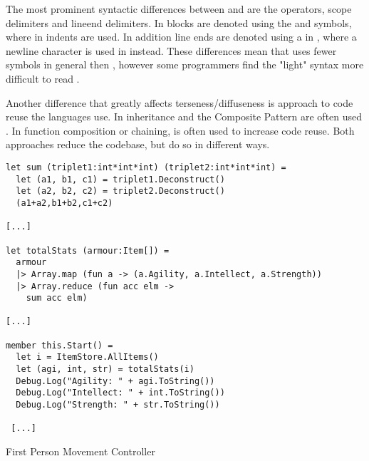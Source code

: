 The most prominent syntactic differences between \cs and \fs are the operators, scope delimiters and lineend delimiters. In \cs blocks are denoted using the \m{\{} and \m{\}} symbols, where in \fs indents are used. In addition line ends are denoted using a \m{;} in \cs, where a newline character is used in \fs instead. These differences mean that \fs uses fewer symbols in general then \cs, however some programmers find the "light" syntax more difficult to read \needcite.

Another difference that greatly affects terseness/diffuseness is approach to code reuse the languages use. In \cs inheritance and the Composite Pattern \needcite are often used \needcite. In \fs function composition or chaining, is often used to increase code reuse. Both approaches reduce the codebase, but do so in different ways. 

\begin{listing}[H]
\begin{verbatim}
let sum (triplet1:int*int*int) (triplet2:int*int*int) =
  let (a1, b1, c1) = triplet1.Deconstruct()
  let (a2, b2, c2) = triplet2.Deconstruct()
  (a1+a2,b1+b2,c1+c2)

[...]

let totalStats (armour:Item[]) =
  armour
  |> Array.map (fun a -> (a.Agility, a.Intellect, a.Strength))
  |> Array.reduce (fun acc elm ->
    sum acc elm)

[...]

member this.Start() =
  let i = ItemStore.AllItems()
  let (agi, int, str) = totalStats(i)
  Debug.Log("Agility: " + agi.ToString())
  Debug.Log("Intellect: " + int.ToString())
  Debug.Log("Strength: " + str.ToString())

 [...]
\end{verbatim}
\caption{First Person Movement Controller \fs}
\label{lst:fs-armour}
\end{listing}
